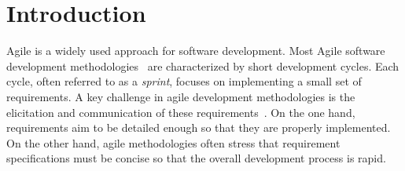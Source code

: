 \begin{abstract}

\end{abstract}

\section{Introduction}
\label{intro}


Agile is a widely used approach for software development. Most Agile software development methodologies~\cite{beck2001manifesto,abrahamsson2010agile,abrahamsson2017agile} are characterized by short development cycles. Each cycle, often referred to as a \emph{sprint}, focuses on implementing a small set of requirements. 
A key challenge in agile development methodologies is the elicitation and communication of these requirements~\cite{wang2014role}. On the one hand, requirements aim to be detailed enough so that they are properly implemented. On the other hand, agile methodologies often stress that requirement specifications must be concise so that the overall development process is rapid. 


